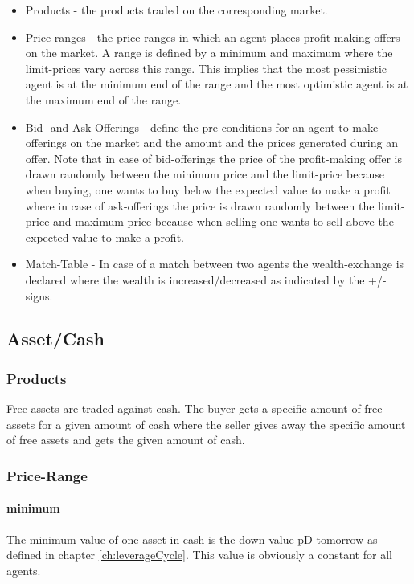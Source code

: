 \documentclass[Bachelorarbeit.tex]{subfiles}
\begin{document}
\begin{itemize}
\item Products - the products traded on the corresponding market.
\item Price-ranges - the price-ranges in which an agent places profit-making offers on the market. A range is defined by a minimum and maximum where the limit-prices vary across this range. This implies that the most pessimistic agent is at the minimum end of the range and the most optimistic agent is at the maximum end of the range.
\item Bid- and Ask-Offerings - define the pre-conditions for an agent to make offerings on the market and the amount and the prices generated during an offer. \medskip
Note that in case of bid-offerings the price of the profit-making offer is drawn randomly between the minimum price and the limit-price because when buying, one wants to buy below the expected value to make a profit where in case of ask-offerings the price is drawn randomly between the limit-price and maximum price because when selling one wants to sell above the expected value to make a profit.
\item Match-Table - In case of a match between two agents the wealth-exchange is declared where the wealth is increased/decreased as indicated by the +/- signs.
\end{itemize}

\subsection{Asset/Cash}
\subsubsection{Products}
Free assets are traded against cash. The buyer gets a specific amount of free assets for a given amount of cash where the seller gives away the specific amount of free assets and gets the given amount of cash.

\subsubsection{Price-Range}

\paragraph{minimum}
The minimum value of one asset in cash is the down-value pD tomorrow as defined in chapter \ref{ch:leverageCycle}. This value is obviously a constant for all agents.
\end{document}
